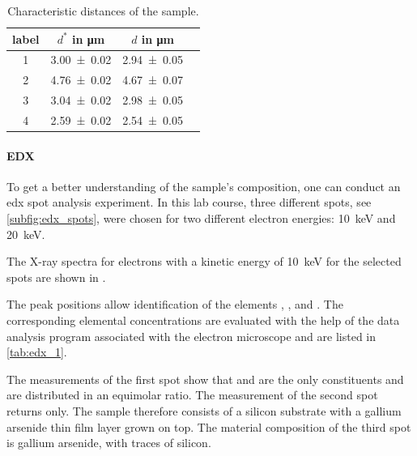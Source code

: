 \begin{table}[h]
	\centering
	\begin{tabular}{cccc}
		\toprule
		label & $d^*$ in \unit{\micro\meter} & $d$ in \unit{\micro\meter} \\
		\midrule
		1     & \num{3.00 \pm 0.02}                   & \num{2.94 \pm 0.05}                 \\
		2     & \num{4.76 \pm 0.02}                   & \num{4.67 \pm 0.07}                 \\
		3     & \num{3.04 \pm 0.02}                   & \num{2.98 \pm 0.05}                 \\
		4     & \num{2.59 \pm 0.02}                   & \num{2.54 \pm 0.05}                 \\
		\bottomrule
	\end{tabular}
	\caption{Characteristic distances of the sample.}
	\label{tab:distances}
\end{table}

\paragraph{EDX}
To get a better understanding of the sample's composition, one can
conduct an \ac{edx} spot analysis experiment.
In this lab course, three different spots, see \cref{subfig:edx_spots},
were chosen for two different electron energies:
\qty{10}{\kilo \electronvolt}
and \qty{20}{\kilo\electronvolt}.

The X-ray spectra for electrons with a kinetic energy of
\qty{10}{\kilo\electronvolt} for the selected spots are shown
in .

The peak positions allow identification of the elements ,
, and .
The corresponding elemental concentrations are evaluated with the help
of the data analysis program associated with the electron microscope and
are listed in \cref{tab:edx_1}.

The measurements of the first spot show that  and  are
the only constituents and are distributed in an equimolar ratio.
The measurement of the second spot returns  only.
The sample therefore consists of a silicon substrate with a
gallium arsenide thin film layer grown on top.
The material composition of the third spot is gallium arsenide,
with traces of silicon.

